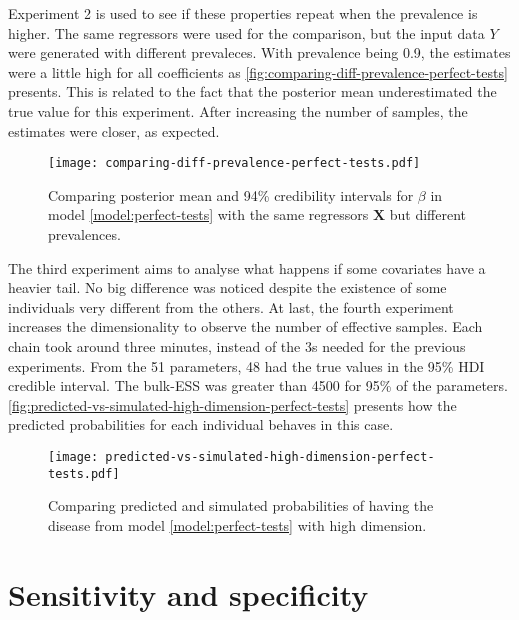 Experiment 2 is used to see if these properties repeat when the prevalence is
higher. The same regressors were used for the comparison, but the input data
$Y$ were generated with different prevaleces. With prevalence being 0.9, the
estimates were a little high for all coefficients as
\autoref{fig:comparing-diff-prevalence-perfect-tests} presents. This is
related to the fact that the posterior mean underestimated the true value for this
experiment. After increasing the number of samples, the estimates were closer,
as expected.

\begin{figure}[!ht]
  \centering
  \caption{\label{fig:comparing-diff-prevalence-perfect-tests}Comparing
    posterior mean and 94\% credibility intervals for $\beta$ in model \eqref{model:perfect-tests} with the same regressors
    $\boldsymbol{X}$ but different prevalences.}
  \texttt{[image: comparing-diff-prevalence-perfect-tests.pdf]}
\end{figure}

The third experiment aims to analyse what happens if some covariates have a
heavier tail. No big difference was noticed despite the existence of some
individuals very different from the others. At last, the fourth experiment
increases the dimensionality to observe the number of effective samples. Each
chain took around three minutes, instead of the 3s needed for the previous
experiments. From the 51 parameters, 48 had the true values in the 95\% HDI
credible interval. The bulk-ESS was greater than 4500 for 95\% of the
parameters. \autoref{fig:predicted-vs-simulated-high-dimension-perfect-tests}
presents how the predicted probabilities for each individual behaves in this
case.

\begin{figure}[!hb]
  \centering
  \caption{\label{fig:predicted-vs-simulated-high-dimension-perfect-tests}
    Comparing predicted and simulated probabilities of having the disease from
    model \eqref{model:perfect-tests} with high dimension.}
  \texttt{[image: predicted-vs-simulated-high-dimension-perfect-tests.pdf]}
\end{figure}

\section{Sensitivity and specificity}

